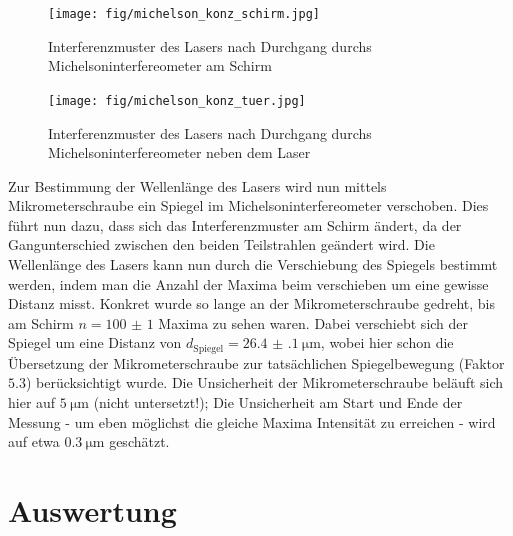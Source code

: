 \documentclass[ngerman]{scrartcl}
\begin{document}
\begin{figure}[H]
    \centering
    \begin{samepage}
        \texttt{[image: fig/michelson\_konz\_schirm.jpg]}
        \caption{Interferenzmuster des Lasers nach Durchgang durchs Michelsoninterfereometer am Schirm}
        \label{fig:michelson_konz_sammel}
    \end{samepage}
\end{figure}
\begin{figure}[H]
    \centering
    \begin{samepage}
        \texttt{[image: fig/michelson\_konz\_tuer.jpg]}
        \caption{Interferenzmuster des Lasers nach Durchgang durchs Michelsoninterfereometer neben dem Laser}
        \label{fig:michelson_konz_sammel_tuer}
    \end{samepage}
\end{figure}
Zur Bestimmung der Wellenlänge des Lasers wird nun mittels Mikrometerschraube ein Spiegel im Michelsoninterfereometer verschoben. Dies führt nun dazu, dass sich das Interferenzmuster am Schirm ändert, da der Gangunterschied zwischen den beiden Teilstrahlen geändert wird. Die Wellenlänge des Lasers kann nun durch die Verschiebung des Spiegels bestimmt werden, indem man die Anzahl der Maxima beim verschieben um eine gewisse Distanz misst. Konkret wurde so lange an der Mikrometerschraube gedreht, bis am Schirm $n = \num{100(1)}$ Maxima zu sehen waren. Dabei verschiebt sich der Spiegel um eine Distanz von $d_\text{Spiegel} = \SI{26.4(1)}{\micro\meter}$, wobei hier schon die Übersetzung der Mikrometerschraube zur tatsächlichen Spiegelbewegung (Faktor $5.3$) berücksichtigt wurde. Die Unsicherheit der Mikrometerschraube beläuft sich hier auf $\SI{5}{\micro\meter}$ (nicht untersetzt!); Die Unsicherheit am Start und Ende der Messung - um eben möglichst die gleiche Maxima Intensität zu erreichen - wird auf etwa $\SI{0.3}{\micro\meter}$ geschätzt. 

\section{Auswertung}
\label{sec:auswertung}
\end{document}
